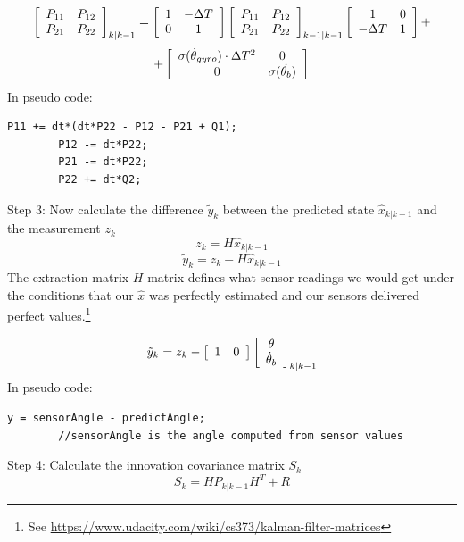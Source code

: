 \documentclass[a4paper]{report}
\begin{document}
		\begin{equation*}
		\left[
		\begin{array}{c c}
		P_{11}	&	P_{12}\\
		P_{21}	&	P_{22}
		\end{array} \right]_{k|k-1}
		=
		\left[
		\begin{array}{c c}
		1 & - \Delta T\\
		0 & 1
		\end{array} \right]
		\left[
		\begin{array}{c c}
		P_{11}	&	P_{12}\\
		P_{21}	&	P_{22}
		\end{array} \right]_{k-1|k-1}
		\left[
		\begin{array}{c c}
		1	&	0\\
		- \Delta T & 1
		\end{array} \right]
		+
		\end{equation*}
		\begin{equation}
		+
		\left[
		\begin{array}{c c}
		\sigma(\dot{\theta}_{gyro})\cdot\Delta T^{2}	&	0\\
		0	&	 \sigma(\dot{\theta_{b}})
		\end{array} \right]
		\end{equation}
    In pseudo code:
		\begin{lstlisting}[frame=single]
		P11 += dt*(dt*P22 - P12 - P21 + Q1);
		P12 -= dt*P22;
		P21 -= dt*P22;
		P22 += dt*Q2;
		\end{lstlisting}
		Step 3: Now calculate the difference $\tilde{y}_{k}$ between the predicted state $\hat{x}_{k|k-1}$ and the measurement $z_{k}$
		\begin{equation}
		z_{k}=H\hat{x}_{k|k-1}
		\end{equation}
		\begin{equation}
		\tilde{y}_{k}=z_{k}-H\hat{x}_{k|k-1}
		\end{equation}
		The extraction matrix $H$ matrix defines what sensor readings we would get under the conditions that our $\hat{x}$ was perfectly estimated and our sensors delivered perfect values.\footnote{See  \url{https://www.udacity.com/wiki/cs373/kalman-filter-matrices}}

		\begin{equation}
		\tilde{y}_{k}=z_{k}-\left[
		\begin{array}{c c}
		1	&	0
		\end{array} \right]
		\left[
		\begin{array}{c}
		\theta \\
		\dot{\theta}_{b}
		\end{array} \right]_{k|k-1}
		\end{equation}
    In pseudo code:
		\begin{lstlisting}[frame=single]
		y = sensorAngle - predictAngle;
		//sensorAngle is the angle computed from sensor values
		\end{lstlisting}
		Step 4: Calculate the innovation covariance matrix $S_{k}$
		\begin{equation}
		S_{k}=HP_{k|k-1}H^{T}+R
		\end{equation}
\end{document}
